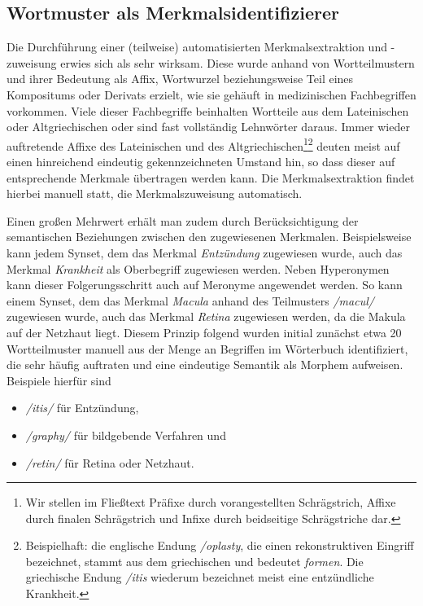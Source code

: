 \documentclass[pagesize,paper=A4,DIV=calc,fontsize=12pt,draft=false]{scrreprt}
\begin{document}
\subsection{Wortmuster als Merkmalsidentifizierer}

Die Durchführung einer (teilweise) automatisierten Merkmalsextraktion und -zuweisung erwies sich als sehr wirksam. 
Diese wurde anhand von Wortteilmustern und ihrer Bedeutung als Affix, Wortwurzel beziehungsweise Teil eines Kompositums oder Derivats erzielt, wie sie gehäuft in medizinischen Fachbegriffen vorkommen. 
Viele dieser Fachbegriffe beinhalten Wortteile aus dem Lateinischen oder Altgriechischen oder sind fast vollständig Lehnwörter daraus. 
Immer wieder auftretende Affixe des Lateinischen und des Altgriechischen\footnote{Wir stellen im Fließtext Präfixe durch vorangestellten Schrägstrich, Affixe durch finalen Schrägstrich und Infixe durch beidseitige Schrägstriche dar.}\footnote{Beispielhaft: die englische Endung \emph{/oplasty}, die einen rekonstruktiven Eingriff bezeichnet, stammt aus dem griechischen und bedeutet \emph{formen}. Die griechische Endung \emph{/itis} wiederum bezeichnet meist eine entzündliche Krankheit.} deuten meist auf einen hinreichend eindeutig gekennzeichneten Umstand hin, so dass dieser auf entsprechende Merkmale übertragen werden kann. 
Die Merkmalsextraktion findet hierbei manuell statt, die Merkmalszuweisung automatisch. 

Einen großen Mehrwert erhält man zudem durch Berücksichtigung der semantischen Beziehungen zwischen den zugewiesenen Merkmalen. 
Beispielsweise kann jedem Synset, dem das Merkmal \emph{Entzündung} zugewiesen wurde, auch das Merkmal \emph{Krankheit} als Oberbegriff zugewiesen werden. 
Neben Hyperonymen kann dieser Folgerungsschritt auch auf Meronyme angewendet werden. 
So kann einem Synset, dem das Merkmal \emph{Macula} anhand des Teilmusters \emph{/macul/} zugewiesen wurde, auch das Merkmal \emph{Retina} zugewiesen werden, da die Makula auf der Netzhaut liegt. 
Diesem Prinzip folgend wurden initial zunächst etwa 20 Wortteilmuster manuell aus der Menge an Begriffen im Wörterbuch identifiziert, die sehr häufig auftraten und eine eindeutige Semantik als Morphem aufweisen. 
Beispiele hierfür sind 

\begin{itemize}
\item
 \emph{/itis/} für Entzündung,
\item
 \emph{/graphy/} für bildgebende Verfahren und
\item
 \emph{/retin/} für Retina oder Netzhaut.
\end{itemize}
\end{document}
